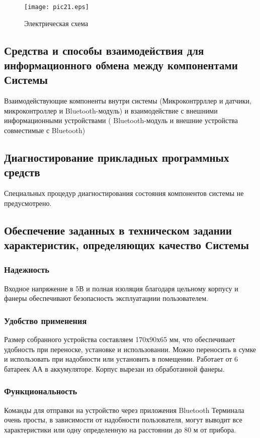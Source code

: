 \documentclass[12pt,a4paper]{scrartcl}
\begin{document}
 	\begin{figure}[h!]  
 		\centering
 		\texttt{[image: pic21.eps]} %
 		\caption{Электрическая схема} 
 		\label{image:pic.21} %
 	\end{figure}		
 	
 		\subsection{Средства и способы взаимодействия для информационного обмена между компонентами Системы }
 	Взаимодействующие компоненты внутри системы (Микроконтррллер и датчики, микроконтроллер и  Bluetooth-модуль) и взаимодействие с внешними информационными устройствами ( Bluetooth-модуль и внешние устройства совместимые с Bluetooth)
 	
 		\subsection{Диагностирование прикладных программных средств }
 	Специальных процедур диагностирования состояния компонентов системы не предусмотрено.
 	
 		\subsection{Обеспечение заданных в техническом задании характеристик, определяющих качество Системы }
 			\subsubsection{Надежность}
 	Входное напряжение в 5В и полная изоляция благодаря цельному корпусу и фанеры обеспечивают безопасность эксплуатациии пользователем.
 			\subsubsection{Удобство применения}
 	Размер собранного устройства составляем 170х90х65 мм, что обеспечивает удобность при переноске, установке и использовании. Можно переносить в сумке и использовать при надобности или установить в помещении. Работает от 6 батареек АА в аккумуляторе. Корпус вырезан из обработанной фанеры.
 			\subsubsection{Функциональность}
 	Команды для отправки на устройство через приложения Bluetooth Терминала очень просты, в зависимости от надобности пользователя, могут выводит все характеристики или одну определенную на расстоянии до 80 м от прибора.
 	
\end{document}
